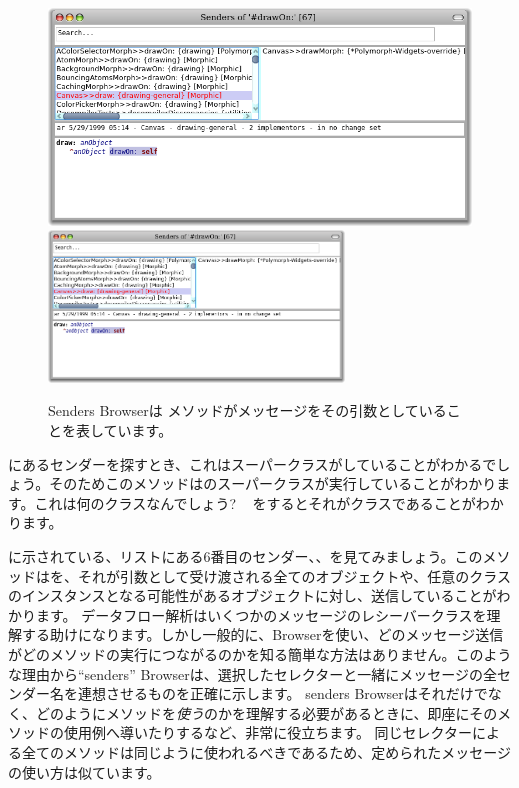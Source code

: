\documentclass[a4paper,10pt,twoside]{book}
\begin{document}
\begin{figure}[htbp]
	\begin{center}
   \ifluluelse
		{\includegraphics[width=\textwidth]{CanvasDraw}}
		{\includegraphics[width=0.7\textwidth]{CanvasDraw}}
	\end{center}
	\caption{Senders Browserは メソッドがメッセージをその引数としていることを表しています。}
\end{figure}

にあるセンダーを探すとき、これはスーパークラスがしていることがわかるでしょう。そのためこのメソッドはのスーパークラスが実行していることがわかります。これは何のクラスなんでしょう? ~ を\actclick するとそれがクラスであることがわかります。 

に示されている、リストにある6番目のセンダー、、を見てみましょう。このメソッドはを、それが引数として受け渡される全てのオブジェクトや、任意のクラスのインスタンスとなる可能性があるオブジェクトに対し、送信していることがわかります。
データフロー解析はいくつかのメッセージのレシーバークラスを理解する助けになります。しかし一般的に、Browserを使い、どのメッセージ送信がどのメソッドの実行につながるのかを知る簡単な方法はありません。このような理由から``senders'' Browserは、選択したセレクターと一緒にメッセージの全センダー名を連想させるものを正確に示します。
senders Browserはそれだけでなく、どのようにメソッドを\emph{使う}のかを理解する必要があるときに、即座にそのメソッドの使用例へ導いたりするなど、非常に役立ちます。
同じセレクターによる全てのメソッドは同じように使われるべきであるため、定められたメッセージの使い方は似ています。
\end{document}
